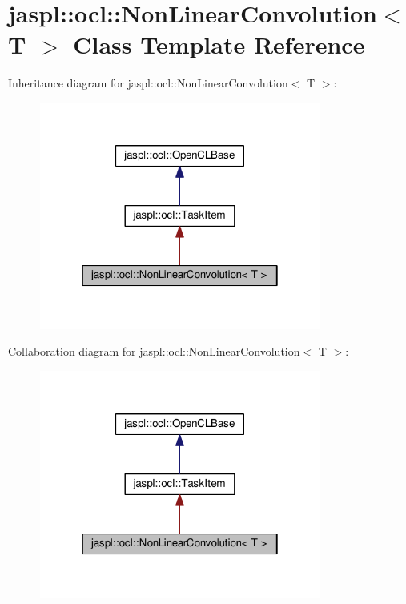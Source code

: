 \hypertarget{classjaspl_1_1ocl_1_1_non_linear_convolution}{}\section{jaspl\+:\+:ocl\+:\+:Non\+Linear\+Convolution$<$ T $>$ Class Template Reference}
\label{classjaspl_1_1ocl_1_1_non_linear_convolution}


Inheritance diagram for jaspl\+:\+:ocl\+:\+:Non\+Linear\+Convolution$<$ T $>$\+:\nopagebreak
\begin{figure}[H]
\begin{center}
\leavevmode
\includegraphics[width=262pt]{classjaspl_1_1ocl_1_1_non_linear_convolution__inherit__graph}
\end{center}
\end{figure}


Collaboration diagram for jaspl\+:\+:ocl\+:\+:Non\+Linear\+Convolution$<$ T $>$\+:\nopagebreak
\begin{figure}[H]
\begin{center}
\leavevmode
\includegraphics[width=262pt]{classjaspl_1_1ocl_1_1_non_linear_convolution__coll__graph}
\end{center}
\end{figure}
